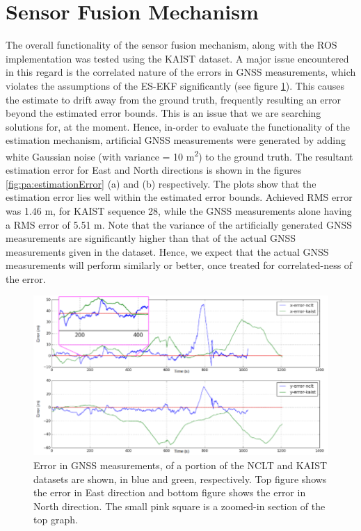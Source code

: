 \section{Sensor Fusion Mechanism}
The overall functionality of the sensor fusion mechanism, along with the \gls{ROS} implementation was tested using the \gls{KAIST} dataset. A major issue encountered in this regard is the correlated nature of the errors in \gls{GNSS} measurements, which violates the assumptions of the \gls{ES-EKF} significantly (see figure \ref{fig:pa:colouredGNSS}). This causes the estimate to drift away from the ground truth, frequently resulting an error beyond the estimated error bounds. This is an issue that we are searching solutions for, at the moment. Hence, in-order to evaluate the functionality of the estimation mechanism, artificial \gls{GNSS} measurements were generated by adding white Gaussian noise (with variance = 10 m\textsuperscript{2}) to the ground truth. The resultant estimation error for East and North directions is shown in the figures \ref{fig:pa:estimationError} (a) and (b) respectively. The plots show that the estimation error lies well within the estimated error bounds. Achieved \gls{RMS} error was 1.46 m, for \gls{KAIST} sequence 28, while the \gls{GNSS} measurements alone having a \gls{RMS} error of 5.51 m. Note that the variance of the artificially generated \gls{GNSS} measurements are significantly higher than that of the actual \gls{GNSS} measurements given in the dataset. Hence, we expect that the actual \gls{GNSS} measurements will perform similarly or better, once treated for correlated-ness of the error.
\begin{figure}[htp]
	\centering
	\includegraphics[width=\textwidth]{figs/coloured_gnss.png}
	\vspace{-0.5cm}
	\caption[Nature of GNSS errors]{Error in GNSS measurements, of a portion of the NCLT and KAIST datasets are shown, in blue and green, respectively. Top figure shows the error in East direction and bottom figure shows the error in North direction. The small pink square is a zoomed-in section of the top graph.}
	\label{fig:pa:colouredGNSS}
	\vspace{0.5cm}
\end{figure}
